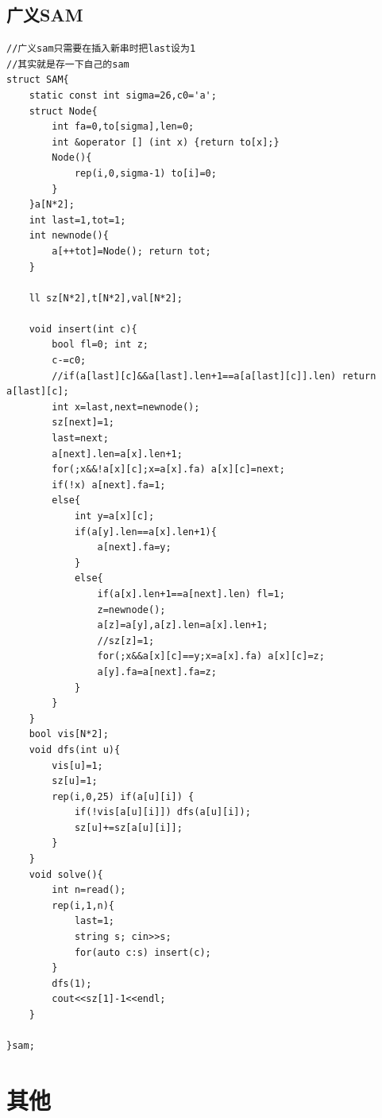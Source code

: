 \documentclass[a4]{ctexart}
\begin{document}
\subsection{广义SAM}
\begin{lstlisting}
//广义sam只需要在插入新串时把last设为1
//其实就是存一下自己的sam
struct SAM{
    static const int sigma=26,c0='a';
    struct Node{
        int fa=0,to[sigma],len=0;
        int &operator [] (int x) {return to[x];}
        Node(){
            rep(i,0,sigma-1) to[i]=0;
        }
    }a[N*2];
    int last=1,tot=1;
    int newnode(){
        a[++tot]=Node(); return tot;
    }

    ll sz[N*2],t[N*2],val[N*2];

    void insert(int c){
        bool fl=0; int z;
        c-=c0;
        //if(a[last][c]&&a[last].len+1==a[a[last][c]].len) return a[last][c]; 
        int x=last,next=newnode();
        sz[next]=1;
        last=next;
        a[next].len=a[x].len+1;
        for(;x&&!a[x][c];x=a[x].fa) a[x][c]=next;
        if(!x) a[next].fa=1;
        else{
            int y=a[x][c];
            if(a[y].len==a[x].len+1){
                a[next].fa=y;   
            }
            else{
                if(a[x].len+1==a[next].len) fl=1;
                z=newnode();
                a[z]=a[y],a[z].len=a[x].len+1;
                //sz[z]=1;
                for(;x&&a[x][c]==y;x=a[x].fa) a[x][c]=z;
                a[y].fa=a[next].fa=z;
            }
        }
    }
    bool vis[N*2];
    void dfs(int u){
        vis[u]=1;
        sz[u]=1;
        rep(i,0,25) if(a[u][i]) {
            if(!vis[a[u][i]]) dfs(a[u][i]);
            sz[u]+=sz[a[u][i]];
        }
    }
    void solve(){
        int n=read();
        rep(i,1,n){
            last=1;
            string s; cin>>s;
            for(auto c:s) insert(c);
        }
        dfs(1);
        cout<<sz[1]-1<<endl;
    }

}sam;
\end{lstlisting}
\section{其他}
\end{document}
